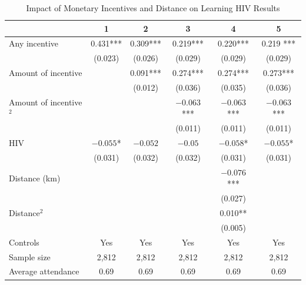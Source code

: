 \documentclass{beamer}
\begin{document}
\begin{frame}[plain]
  \begin{table}[htbp]\centering
    \scriptsize
    \caption{Impact of Monetary Incentives and Distance on Learning HIV Results}
    \label{tab:thornton_main}
    \centering
    \begin{threeparttable}
      \begin{tabular}{l*{5}{c}}
        \toprule
        \multicolumn{1}{l}{\textbf{}}&
        \multicolumn{1}{c}{\textbf{1}}&
        \multicolumn{1}{c}{\textbf{2}}&
        \multicolumn{1}{c}{\textbf{3}}&
        \multicolumn{1}{c}{\textbf{4}}&
        \multicolumn{1}{c}{\textbf{5}}\\
        \midrule
        Any incentive           & 0.431***  & 0.309*** & 0.219***    & 0.220***    & 0.219 ***
        \\
                                & (0.023)   & (0.026)  & (0.029)     & (0.029)     & (0.029)
        \\
        Amount of incentive     &           & 0.091*** & 0.274***    & 0.274***    & 0.273***
        \\
                                &           & (0.012)  & (0.036)     & (0.035)     & (0.036)
        \\
        Amount of incentive$^2$ &           &          & $-0.063$*** & $-0.063$*** & $-0.063$***
        \\
                                &           &          & (0.011)     & (0.011)     & (0.011)
        \\
        HIV                     & $-0.055$* & $-0.052$ & $-0.05$     & $-0.058$*   & $-0.055$*   \\
                                & (0.031)   & (0.032)  & (0.032)     & (0.031)     & (0.031)
        \\
        Distance (km)           &           &          &             & $-0.076$*** &
        \\
                                &           &          &             & (0.027)     &             \\
        Distance$^2$            &           &          &             & 0.010**     &
        \\
                                &           &          &             & (0.005)     &
        \\\midrule
        Controls                & Yes       & Yes      & Yes         & Yes         & Yes
        \\
        Sample size             & 2,812     & 2,812    & 2,812       & 2,812       & 2,812
        \\
        Average attendance      & 0.69      & 0.69     & 0.69        & 0.69        & 0.69
        \\
        \bottomrule
      \end{tabular}
    \end{threeparttable}
  \end{table}

\end{frame}
\end{document}
